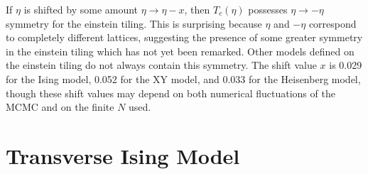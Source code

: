 \documentclass[
  amsmath,
  amssymb,
  aps,
  twocolumn,
  nofootinbib,
  nolongbibliography,
  floatfix,
]{revtex4-2}
\begin{document}
If $\eta$ is shifted by some amount $\eta \rightarrow \eta - x$, then $T_c(\eta)$ possesses $\eta\rightarrow -\eta$ symmetry for the einstein tiling. This is surprising because $\eta$ and $-\eta$ correspond to completely different lattices, suggesting the presence of some greater symmetry in the einstein tiling which has not yet been remarked. Other models defined on the einstein tiling do not always contain this symmetry. The shift value $x$ is 0.029 for the Ising model, 0.052 for the XY model, and 0.033 for the Heisenberg model, though these shift values may depend on both numerical fluctuations of the MCMC and on the finite $N$ used.

\section{Transverse Ising Model}
\label{sec:tim}
\end{document}
